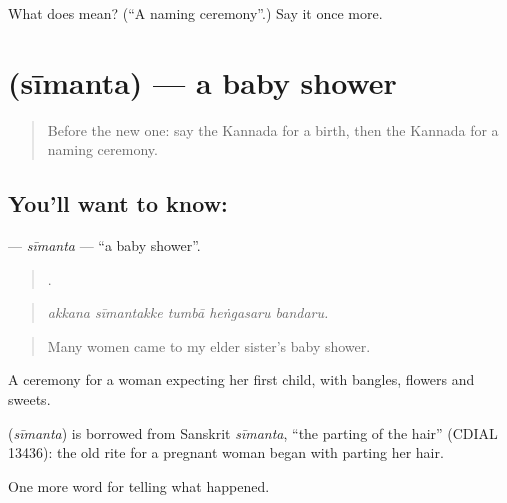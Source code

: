 \begin{tcolorbox}[breakable,colback=teal!4,colframe=teal!35!black,title={Before you move on}]
What does  mean? (\textquotedblleft{}A naming ceremony\textquotedblright{}.) Say it once more.
\end{tcolorbox}
\section[\texorpdfstring{\kn{ಸೀಮಂತ} (sīmanta)}{ಸೀಮಂತ (sīmanta)}]{ (sīmanta) — a baby shower}

\label{lesson:KA-C334-simanta}



\begin{quote}
Before the new one: say the Kannada for a birth, then the Kannada for a naming ceremony.
\end{quote}

\subsection*{You'll want to know: }
\textbf{} — \emph{sīmanta} — \textquotedblleft{}a baby shower\textquotedblright{}.

\begin{quote}
    .
\end{quote}

\begin{quote}
\emph{akkana sīmantakke tumbā heṅgasaru bandaru.}
\end{quote}

\begin{quote}
Many women came to my elder sister's baby shower.
\end{quote}

A ceremony for a woman expecting her first child, with bangles, flowers and sweets.

\begin{cousinweb}
\textbf{} (\emph{sīmanta}) is borrowed from Sanskrit \emph{sīmanta}, \textquotedblleft{}the parting of the hair\textquotedblright{} (CDIAL 13436): the old rite for a pregnant woman began with parting her hair.
\end{cousinweb}

\begin{grammarlens}[title={What you've built}]
One more word for telling what happened.
\end{grammarlens}

